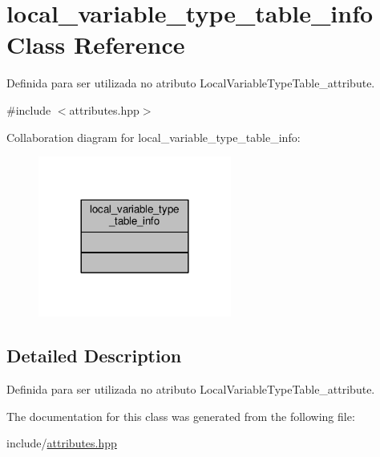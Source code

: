 \hypertarget{classlocal__variable__type__table__info}{\section{local\+\_\+variable\+\_\+type\+\_\+table\+\_\+info Class Reference}
\label{classlocal__variable__type__table__info}
}


Definida para ser utilizada no atributo Local\+Variable\+Type\+Table\+\_\+attribute.  




{\ttfamily \#include $<$attributes.\+hpp$>$}



Collaboration diagram for local\+\_\+variable\+\_\+type\+\_\+table\+\_\+info\+:\nopagebreak
\begin{figure}[H]
\begin{center}
\leavevmode
\includegraphics[width=180pt]{classlocal__variable__type__table__info__coll__graph}
\end{center}
\end{figure}


\subsection{Detailed Description}
Definida para ser utilizada no atributo Local\+Variable\+Type\+Table\+\_\+attribute. 

The documentation for this class was generated from the following file\+:\begin{DoxyCompactItemize}
\item 
include/\hyperlink{attributes_8hpp}{attributes.\+hpp}\end{DoxyCompactItemize}
